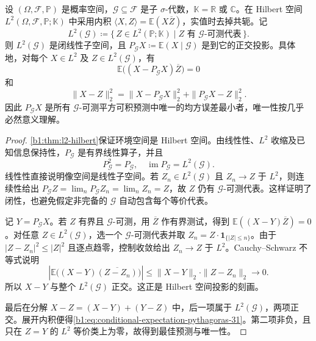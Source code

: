 \begin{theorem}[条件期望的正交投影刻画]\label{b1:thm:conditional-expectation-projection-31}
设 \((\Omega,\mathcal F,\mathbb P)\) 是概率空间，\(\mathcal G\subseteq\mathcal F\) 是子 \(\sigma\)-代数，\(\mathbb K=\mathbb R\) 或 \(\mathbb C\)。在 Hilbert 空间
\(L^2(\Omega,\mathcal F,\mathbb P;\mathbb K)\) 中采用内积
\(\langle X,Z\rangle=\mathbb E(X\overline Z)\)，实值时去掉共轭。记
\[
 L^2(\mathcal G)\coloneqq
 \{\,Z\in L^2(\mathbb P;\mathbb K)
       \mid Z\text{ 有 }\mathcal G\text{-可测代表}\,\}.
\]
则 \(L^2(\mathcal G)\) 是闭线性子空间，且 \(P_{\mathcal G}X\coloneqq\mathbb E(X\mid\mathcal G)\) 是到它的正交投影。具体地，对每个 \(X\in L^2\) 及 \(Z\in L^2(\mathcal G)\)，有
\[
 \mathbb E\bigl((X-P_{\mathcal G}X)\overline Z\bigr)=0
\]
和
\begin{equation}\label{b1:eq:conditional-expectation-pythagoras-31}
 \|X-Z\|_2^2
 =\|X-P_{\mathcal G}X\|_2^2+\|P_{\mathcal G}X-Z\|_2^2.
\end{equation}
因此 \(P_{\mathcal G}X\) 是所有 \(\mathcal G\)-可测平方可积预测中唯一的均方误差最小者，唯一性按几乎必然意义理解。
\end{theorem}
\begin{proof}
\cref{b1:thm:l2-hilbert}保证环境空间是 Hilbert 空间。由线性性、\(L^2\) 收缩及已知信息保持性，\(P_{\mathcal G}\) 是有界线性算子，并且
\[
 P_{\mathcal G}^2=P_{\mathcal G},\quad
 \operatorname{im}P_{\mathcal G}=L^2(\mathcal G).
\]
线性性直接说明像空间是线性子空间。若 \(Z_n\in L^2(\mathcal G)\) 且 \(Z_n\to Z\) 于 \(L^2\)，则连续性给出
\(P_{\mathcal G}Z=\lim_nP_{\mathcal G}Z_n=\lim_nZ_n=Z\)，故 \(Z\) 仍有 \(\mathcal G\)-可测代表。这样证明了闭性，也避免假定非完备的 \(\mathcal G\) 自动包含每个等价代表。

记 \(Y=P_{\mathcal G}X\)。若 \(Z\) 有界且 \(\mathcal G\)-可测，用 \(\overline Z\) 作有界测试，得到 \(\mathbb E((X-Y)\overline Z)=0\)。对任意 \(Z\in L^2(\mathcal G)\)，选一个 \(\mathcal G\)-可测代表并取
\(Z_n=Z\cdot\mathbf1_{\{|Z|\leq n\}}\)。由于
\(|Z-Z_n|^2\leq|Z|^2\) 且逐点趋零，控制收敛给出 \(Z_n\to Z\) 于 \(L^2\)。Cauchy--Schwarz 不等式说明
\[
 \left|\mathbb E\bigl((X-Y)\overline{(Z-Z_n)}\bigr)\right|
 \leq\|X-Y\|_2\cdot\|Z-Z_n\|_2\longrightarrow0.
\]
所以 \(X-Y\) 与整个 \(L^2(\mathcal G)\) 正交。这正是 Hilbert 空间投影的刻画。

最后在分解 \(X-Z=(X-Y)+(Y-Z)\) 中，后一项属于 \(L^2(\mathcal G)\)，两项正交。展开内积便得\eqref{b1:eq:conditional-expectation-pythagoras-31}。第二项非负，且只在 \(Z=Y\) 的 \(L^2\) 等价类上为零，故得到最佳预测与唯一性。
\end{proof}

